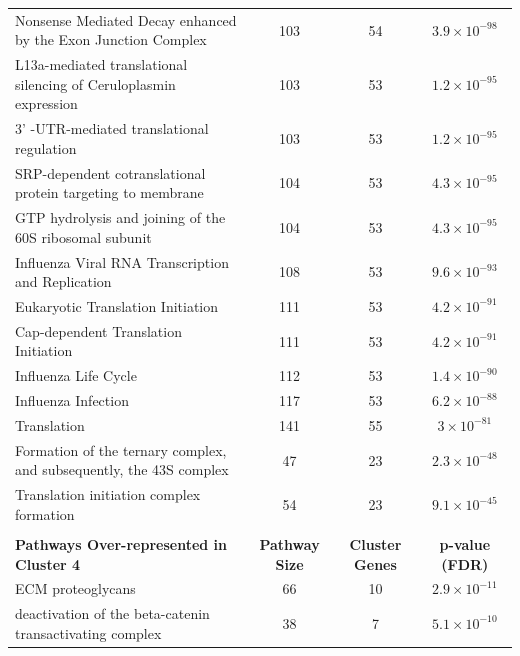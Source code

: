 \begin{table}[!hp]
{\begin{tabular}{lccc}
  \rowcolor{Cluster_Orange!20} 
  Nonsense Mediated Decay enhanced by the Exon Junction Complex & 103 &  54 & $3.9 \times 10^{-98}$ \\ 
  \rowcolor{Cluster_Orange!30} 
  L13a-mediated translational silencing of Ceruloplasmin expression & 103 &  53 & $1.2 \times 10^{-95}$ \\ 
  \rowcolor{Cluster_Orange!20} 
  3' -UTR-mediated translational regulation & 103 &  53 & $1.2 \times 10^{-95}$ \\ 
  \rowcolor{Cluster_Orange!30} 
  SRP-dependent cotranslational protein targeting to membrane & 104 &  53 & $4.3 \times 10^{-95}$ \\ 
  \rowcolor{Cluster_Orange!20} 
  GTP hydrolysis and joining of the 60S ribosomal subunit & 104 &  53 & $4.3 \times 10^{-95}$ \\ 
  \rowcolor{Cluster_Orange!30} 
  Influenza Viral RNA Transcription and Replication & 108 &  53 & $9.6 \times 10^{-93}$ \\ 
  \rowcolor{Cluster_Orange!20} 
  Eukaryotic Translation Initiation & 111 &  53 & $4.2 \times 10^{-91}$ \\ 
  \rowcolor{Cluster_Orange!30} 
  Cap-dependent Translation Initiation & 111 &  53 & $4.2 \times 10^{-91}$ \\ 
  \rowcolor{Cluster_Orange!20} 
  Influenza Life Cycle & 112 &  53 & $1.4 \times 10^{-90}$ \\ 
  \rowcolor{Cluster_Orange!30} 
  Influenza Infection & 117 &  53 & $6.2 \times 10^{-88}$ \\ 
  \rowcolor{Cluster_Orange!20} 
  Translation & 141 &  55 & $3 \times 10^{-81}$ \\ 
  \rowcolor{Cluster_Orange!30} 
  Formation of the ternary complex, and subsequently, the 43S complex &  47 &  23 & $2.3 \times 10^{-48}$ \\ 
  \rowcolor{Cluster_Orange!20} 
  Translation initiation complex formation &  54 &  23 & $9.1 \times 10^{-45}$ \\ 
  \hline
  \\ 
  \cellcolor{white} \large{\textbf{Pathways Over-represented in Cluster 4}} & \large{\textbf{Pathway Size}} & \large{\textbf{Cluster Genes}} & \large{\textbf{p-value (FDR)}} \\ %
  \hline 
  \rowcolor{Cluster_Red!20}
  ECM proteoglycans &  66 &  10 & $2.9 \times 10^{-11}$ \\ 
  \rowcolor{Cluster_Red!15} 
  deactivation of the beta-catenin transactivating complex &  38 &   7 & $5.1 \times 10^{-10}$ \\ 

\end{tabular}}
\end{table}
